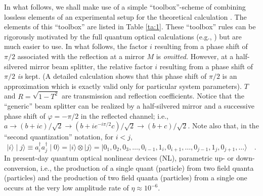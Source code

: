 In what follows,
we shall make use of a simple ``toolbox''-scheme of combining
lossless elements of an experimental setup for the theoretical
calculation
\cite{green-horn-zei}.
 The
elements of this ``toolbox'' are listed in Table \ref{ta:1}.
These ``toolbox'' rules can be rigorously motivated by the full quantum
optical calculations (e.g.,  \cite{yurke-86,teich:90})
but are much easier to use.
In what follows, the factor $i$ resulting from a phase shift of $\pi /2$
associated with the reflection at a mirror $M$ is {\em omitted.}
However, at a half-silvered mirror beam splitter, the relative factor
$i$ resulting from a phase shift of $\pi /2$ {\em is} kept.
(A detailed calculation \cite{born-wolf} shows that
this phase shift of $\pi /2$ is an approximation which is exactly valid
only for particular system parameters).
$T$ and $R=\sqrt{1-T^2}$ are transmission and reflection coefficients.
Notice that the ``generic''
beam splitter can  be realized by a
half-silvered mirror and a successive phase shift of $\varphi =-\pi/2
$ in the reflected channel; i.e.,
$ a  \rightarrow
( b  +i c
)/\sqrt{2}
 \rightarrow
( b  +ie^{-i\pi /2} c
)/\sqrt{2}
 \rightarrow
( b  + c
)/\sqrt{2}
$.
Note also that, in the ``second quantization'' notation, for $i<j$,
\begin{equation}
\mid  i\rangle  \mid  j\rangle  \equiv
a_i^\dagger a_j^\dagger \mid  0\rangle  =
\mid  i\rangle  \otimes \mid  j\rangle  =
\mid  0_1,0_2,0_3,\ldots
,0_{i-1},1_i,0_{i+1},
\ldots, 0_{j-1},1_j,0_{j+1},\ldots \rangle
\quad .
\end{equation}
In present-day quantum optical nonlinear devices (NL), parametric
up- or down-conversion, i.e., the production of a single quant
(particle) from two field quanta (particles) and the production of two
field quanta (particles) from a single one occurs at the very
low amplitude rate of $\eta \approx 10^{-6}$.
